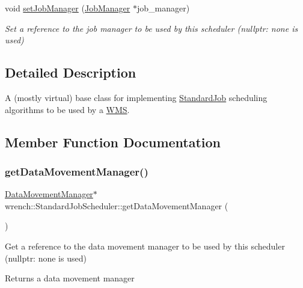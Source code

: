 \begin{DoxyCompactItemize}
void \hyperlink{classwrench_1_1_standard_job_scheduler_ae294e9bdc4d5e91802aad9b82c14672a}{set\+Job\+Manager} (\hyperlink{classwrench_1_1_job_manager}{Job\+Manager} $\ast$job\+\_\+manager)
\begin{DoxyCompactList}\small\item\em Set a reference to the job manager to be used by this scheduler (nullptr\+: none is used) \end{DoxyCompactList}\end{DoxyCompactItemize}


\subsection{Detailed Description}
A (mostly virtual) base class for implementing \hyperlink{classwrench_1_1_standard_job}{Standard\+Job} scheduling algorithms to be used by a \hyperlink{classwrench_1_1_w_m_s}{W\+MS}. 

\subsection{Member Function Documentation}
\mbox{\label{classwrench_1_1_standard_job_scheduler_af570fb0bd50992704a8546d33e644a22}} 
\subsubsection{\texorpdfstring{get\+Data\+Movement\+Manager()}{getDataMovementManager()}}
{\footnotesize\ttfamily \hyperlink{classwrench_1_1_data_movement_manager}{Data\+Movement\+Manager}$\ast$ wrench\+::\+Standard\+Job\+Scheduler\+::get\+Data\+Movement\+Manager (\begin{DoxyParamCaption}{ }\end{DoxyParamCaption})\hspace{0.3cm}{\ttfamily [inline]}}



Get a reference to the data movement manager to be used by this scheduler (nullptr\+: none is used) 

\begin{DoxyReturn}{Returns}
a data movement manager 
\end{DoxyReturn}
\mbox{\label{classwrench_1_1_standard_job_scheduler_a95d72ffb0b6609899bdca37b230c5f8b}} 
